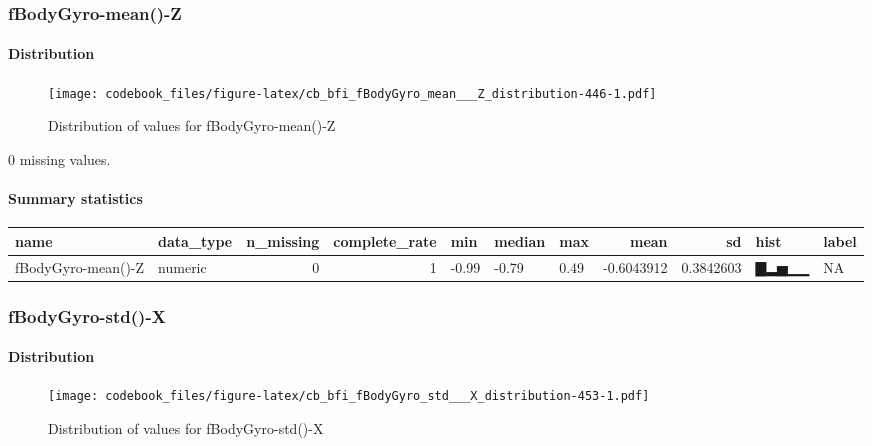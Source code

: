 \documentclass[
]{article}
\begin{document}
\hypertarget{fBodyGyro_mean___Z}{%
\subsubsection{fBodyGyro-mean()-Z}\label{fBodyGyro_mean___Z}}

\hypertarget{fBodyGyro_mean___Z_distribution}{%
\paragraph{Distribution}\label{fBodyGyro_mean___Z_distribution}}

\begin{figure}
\centering
\texttt{[image: codebook\_files/figure-latex/cb\_bfi\_fBodyGyro\_mean\_\_\_Z\_distribution-446-1.pdf]}
\caption{Distribution of values for fBodyGyro-mean()-Z}
\end{figure}

0 missing values.

\hypertarget{fBodyGyro_mean___Z_summary}{%
\paragraph{Summary statistics}\label{fBodyGyro_mean___Z_summary}}

\begin{longtable}[]{@{}llrrlllrrll@{}}
\toprule
name & data\_type & n\_missing & complete\_rate & min & median & max &
mean & sd & hist & label \\
\midrule
\endhead
fBodyGyro-mean()-Z & numeric & 0 & 1 & -0.99 & -0.79 & 0.49 & -0.6043912
& 0.3842603 & ▇▂▅▁▁ & NA \\
\bottomrule
\end{longtable}

\hypertarget{fBodyGyro_std___X}{%
\subsubsection{fBodyGyro-std()-X}\label{fBodyGyro_std___X}}

\hypertarget{fBodyGyro_std___X_distribution}{%
\paragraph{Distribution}\label{fBodyGyro_std___X_distribution}}

\begin{figure}
\centering
\texttt{[image: codebook\_files/figure-latex/cb\_bfi\_fBodyGyro\_std\_\_\_X\_distribution-453-1.pdf]}
\caption{Distribution of values for fBodyGyro-std()-X}
\end{figure}
\end{document}
